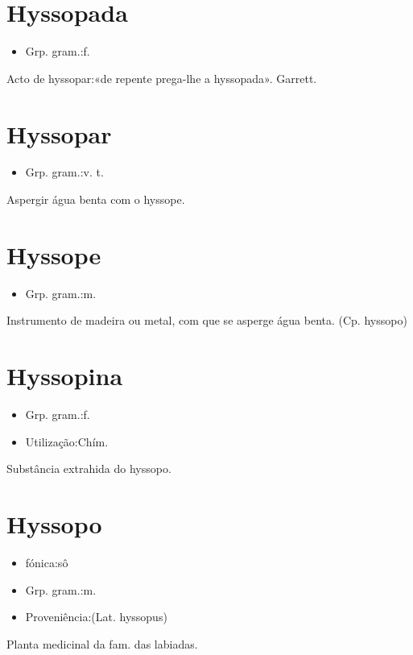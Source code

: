 \documentclass{article}
\begin{document}
\section{Hyssopada}
\begin{itemize}
\item {Grp. gram.:f.}
\end{itemize}
Acto de hyssopar:«\textunderscore de repente prega-lhe a hyssopada\textunderscore ». Garrett.
\section{Hyssopar}
\begin{itemize}
\item {Grp. gram.:v. t.}
\end{itemize}
Aspergir água benta com o hyssope.
\section{Hyssope}
\begin{itemize}
\item {Grp. gram.:m.}
\end{itemize}
Instrumento de madeira ou metal, com que se asperge água benta.
(Cp. \textunderscore hyssopo\textunderscore )
\section{Hyssopina}
\begin{itemize}
\item {Grp. gram.:f.}
\end{itemize}
\begin{itemize}
\item {Utilização:Chím.}
\end{itemize}
Substância extrahida do hyssopo.
\section{Hyssopo}
\begin{itemize}
\item {fónica:sô}
\end{itemize}
\begin{itemize}
\item {Grp. gram.:m.}
\end{itemize}
\begin{itemize}
\item {Proveniência:(Lat. \textunderscore hyssopus\textunderscore )}
\end{itemize}
Planta medicinal da fam. das labiadas.
\end{document}
